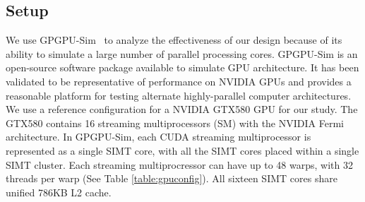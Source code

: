 \subsection{Setup}

We use GPGPU-Sim~\cite{bakhodayuan09} to analyze the effectiveness of our design because of
its ability to simulate a large number of parallel processing cores.
GPGPU-Sim is an open-source software package
available to simulate GPU architecture. 
It has been validated to be representative of performance on NVIDIA
GPUs and provides a reasonable platform for testing alternate
highly-parallel computer architectures. 
We use a reference configuration for a NVIDIA GTX580 GPU for our study.
The GTX580 contains 16 streaming multiprocessors (SM) with the NVIDIA Fermi
architecture. 
In GPGPU-Sim, each CUDA streaming multiprocessor is represented as a
single SIMT core, with all the SIMT cores placed within a single SIMT cluster. 
Each streaming multiprocressor can have up to 48 warps, with 32
threads per warp (See Table \ref{table:gpuconfig}). 
All sixteen SIMT cores share unified 786KB L2 cache. 


